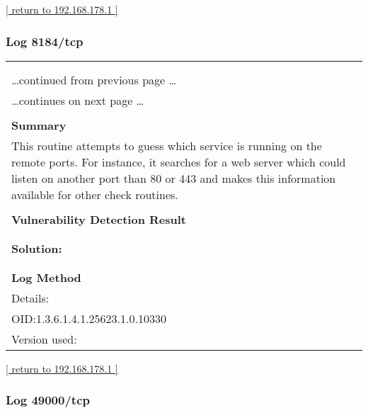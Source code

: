 \documentclass{article}
\begin{document}
\begin{footnotesize}\hyperref[host:192.168.178.1]{[ return to 192.168.178.1 ]}\end{footnotesize}
\subsubsection{Log 8184/tcp}
\label{port:192.168.178.1 8184/tcp Log}

\begin{longtable}{|p{}|}
\hline
\rowcolor{gvm_log}{\color{white}{Log (CVSS: 0.0) }}\\
\rowcolor{gvm_log}{\color{white}{NVT: Services}}\\
\hline
\endfirsthead
\hfill\ldots continued from previous page \ldots \\
\hline
\endhead
\hline
\ldots continues on next page \ldots \\
\endfoot
\hline
\endlastfoot
\\
\textbf{Summary}\\
This routine attempts to guess which service is running on the
  remote ports. For instance, it searches for a web server which could listen on another port than
  80 or 443 and makes this information available for other check routines.\\

        \hline
        \\
\textbf{Vulnerability Detection Result}\\
\rowcolor{white}{\verb=A web server is running on this port=}\\

          \hline
          \\
\textbf{Solution:}\\
\\


        \hline
        \\
\textbf{Log Method}\\
Details:
\rowcolor{white}{\verb=Services=}\\
OID:1.3.6.1.4.1.25623.1.0.10330\\
Version used:
\rowcolor{white}{\verb=2021-03-15T10:42:03Z=}\\
\end{longtable}

\begin{footnotesize}\hyperref[host:192.168.178.1]{[ return to 192.168.178.1 ]}\end{footnotesize}
\subsubsection{Log 49000/tcp}
\label{port:192.168.178.1 49000/tcp Log}
\end{document}
